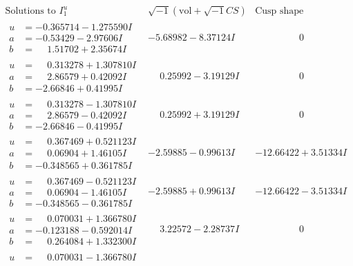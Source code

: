 \documentclass[1p]{elsarticle_modified}
\theoremstyle{definition}
\newcommand{\I}{\sqrt{-1}}
\begin{document}
$$\begin{array}{c|c|c}
\text{Solutions to }I^u_{1}& \I (\text{vol} + \sqrt{-1}CS) & \text{Cusp shape}\\
 \hline 
\begin{aligned}
u &= -0.365714 - 1.275590 I \\
a &= -0.53429 - 2.97606 I \\
b &= \phantom{-}1.51702 + 2.35674 I\end{aligned}
 & -5.68982 - 8.37124 I & \phantom{-0.000000 } 0 \\ \hline\begin{aligned}
u &= \phantom{-}0.313278 + 1.307810 I \\
a &= \phantom{-}2.86579 + 0.42092 I \\
b &= -2.66846 + 0.41995 I\end{aligned}
 & \phantom{-}0.25992 - 3.19129 I & \phantom{-0.000000 } 0 \\ \hline\begin{aligned}
u &= \phantom{-}0.313278 - 1.307810 I \\
a &= \phantom{-}2.86579 - 0.42092 I \\
b &= -2.66846 - 0.41995 I\end{aligned}
 & \phantom{-}0.25992 + 3.19129 I & \phantom{-0.000000 } 0 \\ \hline\begin{aligned}
u &= \phantom{-}0.367469 + 0.521123 I \\
a &= \phantom{-}0.06904 + 1.46105 I \\
b &= -0.348565 + 0.361785 I\end{aligned}
 & -2.59885 - 0.99613 I & -12.66422 + 3.51334 I \\ \hline\begin{aligned}
u &= \phantom{-}0.367469 - 0.521123 I \\
a &= \phantom{-}0.06904 - 1.46105 I \\
b &= -0.348565 - 0.361785 I\end{aligned}
 & -2.59885 + 0.99613 I & -12.66422 - 3.51334 I \\ \hline\begin{aligned}
u &= \phantom{-}0.070031 + 1.366780 I \\
a &= -0.123188 - 0.592014 I \\
b &= \phantom{-}0.264084 + 1.332300 I\end{aligned}
 & \phantom{-}3.22572 - 2.28737 I & \phantom{-0.000000 } 0 \\ \hline\begin{aligned}
u &= \phantom{-}0.070031 - 1.366780 I \\

\end{aligned}
\end{array}$$
\end{document}

